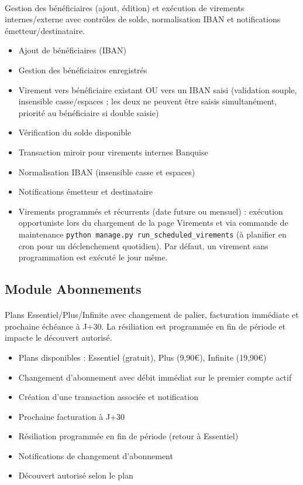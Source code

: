 \documentclass[12pt,a4paper]{report}
\begin{document}
\paragraph{}Gestion des bénéficiaires (ajout, édition) et exécution de virements internes/externe avec contrôles de solde, normalisation IBAN et notifications émetteur/destinataire.
\begin{itemize}[leftmargin=1.5cm]
    \item Ajout de bénéficiaires (IBAN)
    \item Gestion des bénéficiaires enregistrés
    \item Virement vers bénéficiaire existant OU vers un IBAN saisi (validation souple, insensible casse/espaces ; les deux ne peuvent être saisis simultanément, priorité au bénéficiaire si double saisie)
    \item Vérification du solde disponible
    \item Transaction miroir pour virements internes Banquise
    \item Normalisation IBAN (insensible casse et espaces)
    \item Notifications émetteur et destinataire
    \item Virements programmés et récurrents (date future ou mensuel) : exécution opportuniste lors du chargement de la page Virements et via commande de maintenance \texttt{python manage.py run\_scheduled\_virements} (à planifier en cron pour un déclenchement quotidien). Par défaut, un virement sans programmation est exécuté le jour même.
\end{itemize}

\subsection{Module Abonnements}
\paragraph{}Plans Essentiel/Plus/Infinite avec changement de palier, facturation immédiate et prochaine échéance à J+30. La résiliation est programmée en fin de période et impacte le découvert autorisé.
\begin{itemize}[leftmargin=1.5cm]
    \item Plans disponibles : Essentiel (gratuit), Plus (9,90€), Infinite (19,90€)
    \item Changement d'abonnement avec débit immédiat sur le premier compte actif
    \item Création d'une transaction associée et notification
    \item Prochaine facturation à J+30
    \item Résiliation programmée en fin de période (retour à Essentiel)
    \item Notifications de changement d'abonnement
    \item Découvert autorisé selon le plan
\end{itemize}
\end{document}
